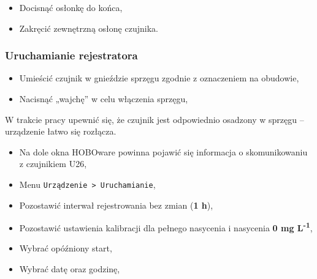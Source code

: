\documentclass[
  letterpaper,
  DIV=11,
  numbers=noendperiod]{scrreprt}
\providecommand{\tightlist}{%
  \setlength{\itemsep}{0pt}\setlength{\parskip}{0pt}}\usepackage{longtable,booktabs,array}
\begin{document}
\begin{itemize}
\tightlist
\item
  Docisnąć osłonkę do końca,
\item
  Zakręcić zewnętrzną osłonę czujnika.
\end{itemize}

\hypertarget{uruchamianie-rejestratora}{%
\subsubsection{Uruchamianie
rejestratora}\label{uruchamianie-rejestratora}}

\begin{itemize}
\tightlist
\item
  Umieścić czujnik w gnieździe sprzęgu zgodnie z oznaczeniem na
  obudowie,
\item
  Nacisnąć „wajchę'' w celu włączenia sprzęgu,
\end{itemize}

\begin{tcolorbox}[enhanced jigsaw, toptitle=1mm, bottomtitle=1mm, opacitybacktitle=0.6, colframe=quarto-callout-note-color-frame, bottomrule=.15mm, title=\textcolor{quarto-callout-note-color}{\faInfo}\hspace{0.5em}{Sprzęg}, colbacktitle=quarto-callout-note-color!10!white, left=2mm, breakable, rightrule=.15mm, colback=white, opacityback=0, arc=.35mm, coltitle=black, leftrule=.75mm, toprule=.15mm, titlerule=0mm]

W trakcie pracy upewnić się, że czujnik jest odpowiednio osadzony w
sprzęgu -- urządzenie łatwo się rozłącza.

\end{tcolorbox}

\begin{itemize}
\tightlist
\item
  Na dole okna HOBOware powinna pojawić się informacja o skomunikowaniu
  z czujnikiem U26,
\item
  Menu \texttt{Urządzenie\ \textgreater{}\ Uruchamianie},
\item
  Pozostawić interwał rejestrowania bez zmian (\textbf{1 h}),
\item
  Pozostawić ustawienia kalibracji dla pełnego nasycenia i nasycenia
  \textbf{0 mg L\textsuperscript{-1}},
\item
  Wybrać opóźniony start,
\item
  Wybrać datę oraz godzinę,
\end{itemize}
\end{document}
